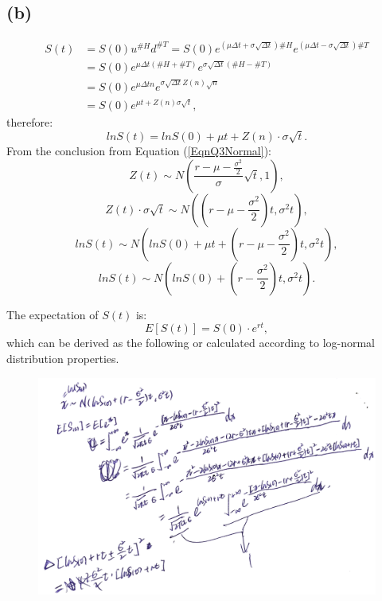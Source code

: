 \documentclass[final,3p,times]{elsarticle}
\begin{document}
	\subsection{(b)}
		\begin{equation}
			\begin{split}
				S(t)&=S(0) u^{\#H} d^{\#T}=S(0) e^{\left(\mu \Delta t + \sigma \sqrt{\Delta t}\right)\#H} e^{\left(\mu \Delta t - \sigma \sqrt{\Delta t}\right)\#T} \\
				&=S(0) e^{\mu \Delta t \left(\#H+\#T\right) } e^{\sigma \sqrt{\Delta t} \left(\#H-\#T\right) } \\
				&=S(0) e^{\mu \Delta t n } e^{\sigma \sqrt{\Delta t} Z(n) \sqrt{n} } \\
				&=S(0) e^{\mu t + Z(n) \sigma \sqrt{t}}
				,
			\end{split}
		\end{equation}
		therefore:
		\begin{equation}
			ln S(t) = ln S(0) + \mu t + Z(n) \cdot \sigma \sqrt{t}
			.
		\end{equation}
		From the conclusion from Equation (\ref{EqnQ3Normal}):
		\begin{equation*}
			Z(t) \sim N\left(\frac{r-\mu-\frac{\sigma^2}{2}}{\sigma} \sqrt{t},1\right)
			,
		\end{equation*}
		\begin{equation*}
			Z(t) \cdot \sigma \sqrt{t} \sim N\left(\left(r-\mu-\frac{\sigma^2}{2}\right) t,\sigma^2 t\right)
			,
		\end{equation*}
		\begin{equation*}
			ln S(t) \sim N\left(ln S(0)+\mu t+\left(r-\mu-\frac{\sigma^2}{2}\right) t,\sigma^2 t\right)
			,
		\end{equation*}
		\begin{equation}
			ln S(t) \sim N\left(ln S(0)+\left(r-\frac{\sigma^2}{2}\right) t,\sigma^2 t\right)
			.
		\end{equation}
		
		The expectation of $S(t)$ is:
		\begin{equation}
			E[S(t)]=S(0)\cdot e^{rt}
			,
		\end{equation}
		which can be derived as the following or calculated according to log-normal distribution properties.
		
		\begin{figure}[H]
			\centering
			\includegraphics*[width=12cm]{MyDerivationOfLogNormalExpectation.png}
		\end{figure}
		
\end{document}
